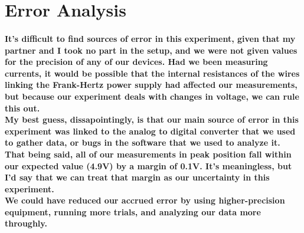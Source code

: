 \documentclass{amsart}
\begin{document}
\section{Error Analysis}
\paragraph{It's difficult to find sources of error in this experiment, given that my partner and I took no part in the setup, and we were not given values for the precision of any of our devices. Had we been measuring currents, it would be possible that the internal resistances of the wires linking the Frank-Hertz power supply had affected our measurements, but because our experiment deals with changes in voltage, we can rule this out. \\My best guess, dissapointingly, is that our main source of error in this experiment was linked to the analog to digital converter that we used to gather data, or bugs in the software that we used to analyze it. That being said, all of our measurements in peak position fall within our expected value (4.9V) by a margin of 0.1V. It's meaningless, but I'd say that we can treat that margin as our uncertainty in this experiment. \\ We could have reduced our accrued error by using higher-precision equipment, running more trials, and analyzing our data more throughly. }
\end{document}
